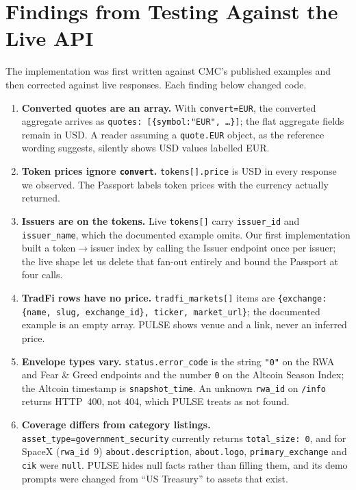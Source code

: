 \documentclass[11pt]{article}
\newcommand{\code}[1]{\texttt{\small #1}}
\begin{document}
\section{Findings from Testing Against the Live API}

The implementation was first written against CMC's published examples and then corrected against live responses. Each finding below changed code.

\begin{enumerate}
\item \textbf{Converted quotes are an array.} With \code{convert=EUR}, the converted aggregate arrives as \code{quotes: [\{symbol:"EUR",\,\dots\}]}; the flat aggregate fields remain in USD. A reader assuming a \code{quote.EUR} object, as the reference wording suggests, silently shows USD values labelled EUR.
\item \textbf{Token prices ignore \code{convert}.} \code{tokens[].price} is USD in every response we observed. The Passport labels token prices with the currency actually returned.
\item \textbf{Issuers are on the tokens.} Live \code{tokens[]} carry \code{issuer\_id} and \code{issuer\_name}, which the documented example omits. Our first implementation built a token\(\to\)issuer index by calling the Issuer endpoint once per issuer; the live shape let us delete that fan-out entirely and bound the Passport at four calls.
\item \textbf{TradFi rows have no price.} \code{tradfi\_markets[]} items are \code{\{exchange:\{name,\,slug,\,exchange\_id\},\,ticker,\,market\_url\}}; the documented example is an empty array. \textsc{PULSE} shows venue and a link, never an inferred price.
\item \textbf{Envelope types vary.} \code{status.error\_code} is the string \code{"0"} on the RWA and Fear \& Greed endpoints and the number \code{0} on the Altcoin Season Index; the Altcoin timestamp is \code{snapshot\_time}. An unknown \code{rwa\_id} on \code{/info} returns HTTP~400, not 404, which \textsc{PULSE} treats as not found.
\item \textbf{Coverage differs from category listings.} \code{asset\_type=government\_security} currently returns \code{total\_size: 0}, and for SpaceX (\code{rwa\_id}~9) \code{about.description}, \code{about.logo}, \code{primary\_exchange} and \code{cik} were \code{null}. \textsc{PULSE} hides null facts rather than filling them, and its demo prompts were changed from ``US Treasury'' to assets that exist.
\end{enumerate}
\end{document}
